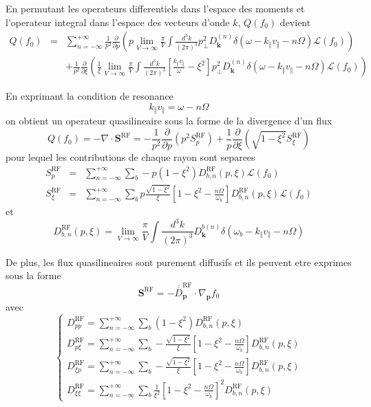 En permutant les operateurs differentiels dans l'espace des moments
et l'operateur integral dans l'espace des vecteurs d'onde $k$, $Q(f_{0})$
devient \begin{eqnarray*}
Q(f_{0}) & = & \sum_{n=-\infty}^{+\infty}\frac{1}{p^{2}}\frac{\partial}{\partial p}\left(p\lim_{V\rightarrow\infty}\frac{\pi}{V}\int\frac{d^{3}k}{(2\pi)^{3}}p_{\bot}^{2}D_{\mathbf{k}}^{(n)}\delta(\omega-k_{\Vert}v_{\Vert}-n\Omega)\mathcal{L}(f_{0})\right)\\
 &  & +\frac{1}{p^{2}}\frac{\partial}{\partial\xi}\left(\frac{1}{\xi}\lim_{V\rightarrow\infty}\frac{\pi}{V}\int\frac{d^{3}k}{(2\pi)^{3}}\left[\frac{k_{\Vert}v_{\Vert}}{\omega}-\xi^{2}\right]p_{\bot}^{2}D_{\mathbf{k}}^{(n)}\delta(\omega-k_{\Vert}v_{\Vert}-n\Omega)\mathcal{L}(f_{0})\right)\end{eqnarray*}


En exprimant la condition de resonance \[
k_{\Vert}v_{\Vert}=\omega-n\Omega\]
 on obtient un operateur quasilineaire sous la forme de la divergence
d'un flux \[
Q(f_{0})=-\nabla\cdot\mathbf{S}^{\text{RF}}=-\frac{1}{p^{2}}\frac{\partial}{\partial p}\left(p^{2}S_{p}^{\text{RF}}\right)+\frac{1}{p}\frac{\partial}{\partial\xi}\left(\sqrt{1-\xi^{2}}S_{\xi}^{\text{RF}}\right)\]
 pour lequel les contributions de chaque rayon sont separees \begin{eqnarray*}
S_{p}^{\text{RF}} & = & \sum_{n=-\infty}^{+\infty}\sum_{b}-p(1-\xi^{2})D_{b,n}^{\text{RF}}(p,\xi)\mathcal{L}(f_{0})\\
S_{\xi}^{\text{RF}} & = & \sum_{n=-\infty}^{+\infty}\sum_{b}p\frac{\sqrt{1-\xi^{2}}}{\xi}\left[1-\xi^{2}-\frac{n\Omega}{\omega_{b}}\right]D_{b,n}^{\text{RF}}(p,\xi)\mathcal{L}(f_{0})\end{eqnarray*}
 et \[
D_{b,n}^{\text{RF}}(p,\xi)=\lim_{V\rightarrow\infty}\frac{\pi}{V}\int\frac{d^{3}k}{(2\pi)^{3}}D_{\mathbf{k}}^{b(n)}\delta(\omega_{b}-k_{\Vert}v_{\Vert}-n\Omega)\]


De plus, les flux quasilineaires sont purement diffusifs et ils peuvent
etre exprimes sous la forme \[
\mathbf{S}^{\text{RF}}=-\overline{\overline{D}}_{\mathbf{p}}^{\text{RF}}\cdot\nabla_{\mathbf{p}}f_{0}\]
 avec \[
\left\{ \begin{array}{l}
D_{pp}^{\text{RF}}=\sum_{n=-\infty}^{+\infty}\sum_{b}(1-\xi^{2})D_{b,n}^{\text{RF}}(p,\xi)\\
D_{p\xi}^{\text{RF}}=\sum_{n=-\infty}^{+\infty}\sum_{b}-\frac{\sqrt{1-\xi^{2}}}{\xi}\left[1-\xi^{2}-\frac{n\Omega}{\omega_{b}}\right]D_{b,n}^{\text{RF}}(p,\xi)\\
D_{\xi p}^{\text{RF}}=\sum_{n=-\infty}^{+\infty}\sum_{b}-\frac{\sqrt{1-\xi^{2}}}{\xi}\left[1-\xi^{2}-\frac{n\Omega}{\omega_{b}}\right]D_{b,n}^{\text{RF}}(p,\xi)\\
D_{\xi\xi}^{\text{RF}}=\sum_{n=-\infty}^{+\infty}\sum_{b}\frac{1}{\xi^{2}}\left[1-\xi^{2}-\frac{n\Omega}{\omega_{b}}\right]^{2}D_{b,n}^{\text{RF}}(p,\xi)\end{array}\right.\]


